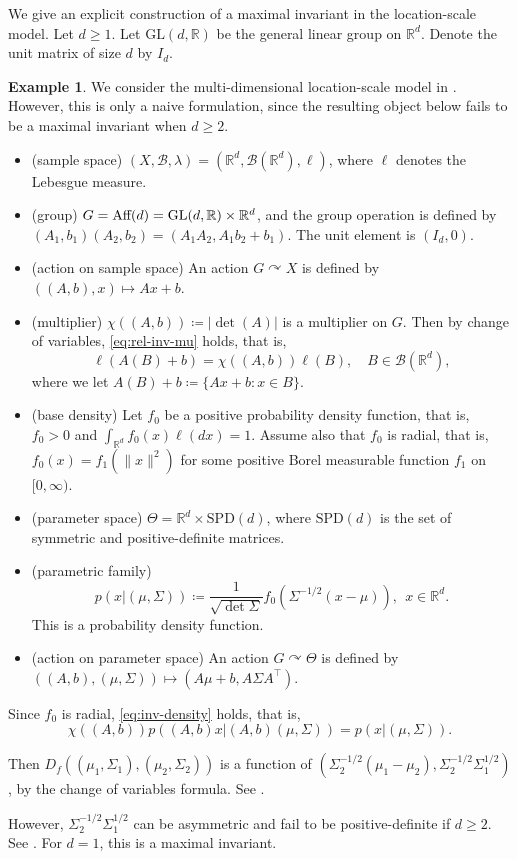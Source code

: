 \documentclass[a4paper, reqno, 11pt]{article}
\theoremstyle{definition}
\newtheorem{Exa}[Thm]{Example}
\def\GL{\mathrm{GL}}
\def\SPD{\mathrm{SPD}}
\begin{document}
We give an explicit construction of a maximal invariant in the location-scale model. 
Let $d \ge 1$. 
Let $\GL(d, \mathbb{R})$ be the general linear group on $\mathbb{R}^d$. 
Denote the unit matrix of size $d$ by $I_d$. 

\begin{Exa}\label{exa:naive}
We consider the multi-dimensional location-scale model in \cite[Section 3]{Eaton1989}. 
However, this is only a naive formulation, since the resulting object below fails to be a maximal invariant when $d\ge 2$.  
\begin{itemize}
\item (sample space) $(X, \mathcal{B}, \lambda) = (\mathbb{R}^d, \mathcal{B}(\mathbb{R}^d), \ell)$, where $\ell$ denotes the Lebesgue measure. 
\item (group) $G = \textup{Aff}(d) = \GL(d, \mathbb{R}) \times \mathbb{R}^d$, and the group operation is defined by $(A_1, b_1)(A_2, b_2) = (A_1 A_2, A_1 b_2 + b_1)$. 
The unit element is $(I_d, 0)$. 
\item (action on sample space) An action $G \curvearrowright X$ is defined by $((A,b), x) \mapsto Ax + b$. 
\item (multiplier) $\chi((A,b)) \coloneqq   |\det(A)|$ is a multiplier on $G$. 
Then by change of variables, \eqref{eq:rel-inv-mu} holds, that is, 
\[ \ell(A(B) + b) = \chi((A,b)) \ell(B), \quad B \in \mathcal{B}(\mathbb{R}^d), \]
where we let $A(B) + b \coloneqq  \{Ax+b \colon x \in B\}$.   
\item (base density) Let $f_0$ be a positive probability density function, that is, $f_0 > 0$ and $\displaystyle \int_{\mathbb{R}^d} f_0 (x) \ell(dx) = 1$. 
Assume also that $f_0$ is radial, that is, $f_0 (x) = f_1 (\|x\|^2)$ for some positive Borel measurable function $f_1$ on $[0,\infty)$. 
\item (parameter space) $\Theta = \mathbb{R}^d \times \SPD(d)$, 
where $\SPD(d)$ is the set of symmetric and positive-definite matrices. 
\item (parametric family)
\[ p\left(x | (\mu, \Sigma) \right) \coloneqq   \frac{1}{\sqrt{\det \Sigma}} f_0 \left(\Sigma^{-1/2}(x - \mu)\right), \ \ x \in \mathbb{R}^d. \]
This is a probability density function. 
\item  (action on parameter space) An action $G \curvearrowright \Theta$ is defined by $((A,b), (\mu, \Sigma)) \mapsto (A\mu + b, A \Sigma A^{\top})$. 
\end{itemize}

Since $f_0$ is radial, \eqref{eq:inv-density} holds, that is, 
\[ \chi((A,b)) p\left((A,b)x | (A,b)(\mu, \Sigma)\right) = p\left(x | (\mu, \Sigma) \right). \]



Then 
$D_f \left((\mu_1, \Sigma_1), (\mu_2, \Sigma_2)\right) $ is a function of $\left(\Sigma_2^{-1/2} (\mu_1 - \mu_2),  \Sigma_2^{-1/2} \Sigma_1^{1/2}\right)$, by the change of variables formula. 
See \cite[Proposition 1]{NO2024}. 

However, $\Sigma_2^{-1/2} \Sigma_1^{1/2}$ can be asymmetric and fail to be positive-definite if $d \ge 2$. 
See \cite[Remark 3.1.15]{BCR1984}. 
For $d = 1$, this is a maximal invariant. 
\end{Exa}
\end{document}
